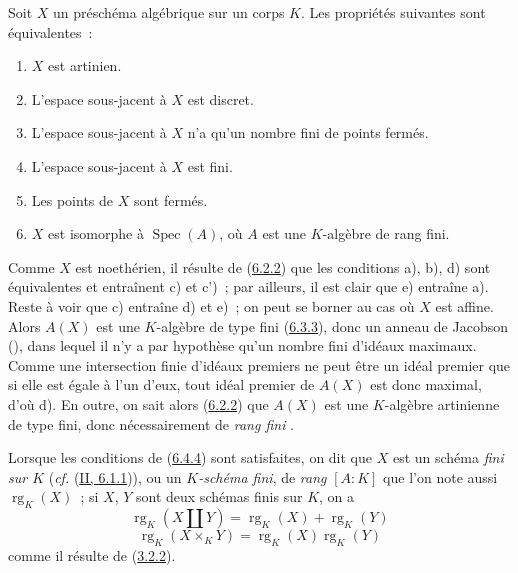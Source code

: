 \begin{proposition}[6.4.4]
\label{I.6.4.4-fr}
Soit $X$ un préschéma algébrique sur un corps $K$. Les propriétés suivantes
sont équivalentes~:
\begin{enumerate}
  \item[\rm(a)] $X$ est artinien.
  \item[\rm(b)] L'espace sous-jacent à $X$ est discret.
  \item[\rm(c)] L'espace sous-jacent à $X$ n'a qu'un nombre fini de points
    fermés.
  \item[\rm(c')] L'espace sous-jacent à $X$ est fini.
  \item[\rm(d)] Les points de $X$ sont fermés.
  \item[\rm(e)] $X$ est isomorphe à $\operatorname{Spec}(A)$, où $A$ est une
    $K$-algèbre de rang fini.
\end{enumerate}
\end{proposition}

Comme $X$ est noethérien, il résulte de (\hyperref[I.6.2.2-fr]{6.2.2}) que
les conditions a), b), d) sont équivalentes et entraînent c) et c')~; par
ailleurs, il est clair que e) entraîne a). Reste à voir que c) entraîne d) et
e)~; on peut se borner au cas où $X$ est affine. Alors $A(X)$ est une
$K$-algèbre de type fini (\hyperref[I.6.3.3-fr]{6.3.3}), donc un anneau de
Jacobson (\cite[p.~3-11 et 3-12]{I-1}), dans lequel il n'y a par hypothèse
qu'un nombre fini d'idéaux maximaux. Comme une intersection finie d'idéaux
premiers ne peut être un idéal premier que si elle est égale à l'un d'eux,
tout idéal premier de $A(X)$ est donc maximal, d'où d). En outre, on sait
alors (\hyperref[I.6.2.2-fr]{6.2.2}) que $A(X)$ est une $K$-algèbre
artinienne de type fini, donc nécessairement de \emph{rang fini} \cite{I-21}.

\begin{env}[6.4.5]
\label{I.6.4.5-fr}
Lorsque les conditions de (\hyperref[I.6.4.4-fr]{6.4.4}) sont satisfaites,
on dit que $X$ est un schéma \emph{fini sur $K$}
(\emph{cf.} (\hyperref[II.6.1.1-fr]{II, 6.1.1})), ou un
\emph{$K$-schéma fini}, de \emph{rang} $[A:K]$ que l'on note aussi
$\operatorname{rg}_K(X)$~; si $X$, $Y$ sont deux schémas finis sur $K$, on a
\[
  \operatorname{rg}_K(X\amalg Y)
  =\operatorname{rg}_K(X)+\operatorname{rg}_K(Y)
  \tag{6.4.5.1}\label{I.6.4.5.1-fr}
\]
\[
  \operatorname{rg}_K(X\times_K Y)
  =\operatorname{rg}_K(X)\operatorname{rg}_K(Y)
  \tag{6.4.5.2}\label{I.6.4.5.2-fr}
\]
comme il résulte de (\hyperref[I.3.2.2-fr]{3.2.2}).
\end{env}

